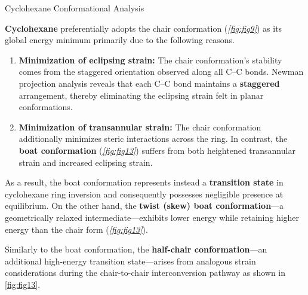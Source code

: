 \documentclass[10pt]{article}
\begin{document}
    \begin{core}{Cyclohexane Conformational Analysis}
   
      \textbf{Cyclohexane} preferentially adopts the chair conformation (\textit{\autoref{fig:fig9}}) as its global energy minimum primarily due to the following reasons.


      \begin{enumerate}

        \item \textbf{Minimization of eclipsing strain:} The chair conformation's stability comes from the staggered orientation observed along all C--C bonds. Newman projection analysis reveals that each C--C bond maintains a \textbf{staggered} arrangement, thereby eliminating the eclipsing strain felt in planar conformations.

         
        \item \textbf{Minimization of transannular strain:} The chair conformation additionally minimizes steric interactions across the ring. In contrast, the \textbf{boat conformation} (\textit{\autoref{fig:fig13}}) suffers from both heightened transannular strain and increased eclipsing strain.

      \end{enumerate} 
       
      As a result, the boat conformation represents instead a \textbf{transition state} in cyclohexane ring inversion and consequently possesses negligible presence at equilibrium. On the other hand, the \textbf{twist (skew) boat conformation}---a geometrically relaxed intermediate---exhibits lower energy while retaining higher energy than the chair form (\textit{\autoref{fig:fig13}}).

       
      Similarly to the boat conformation, the \textbf{half-chair conformation}---an additional high-energy transition state---arises from analogous strain considerations during the chair-to-chair interconversion pathway as shown in \autoref{fig:fig13}.

              
    \end{core}
\end{document}
